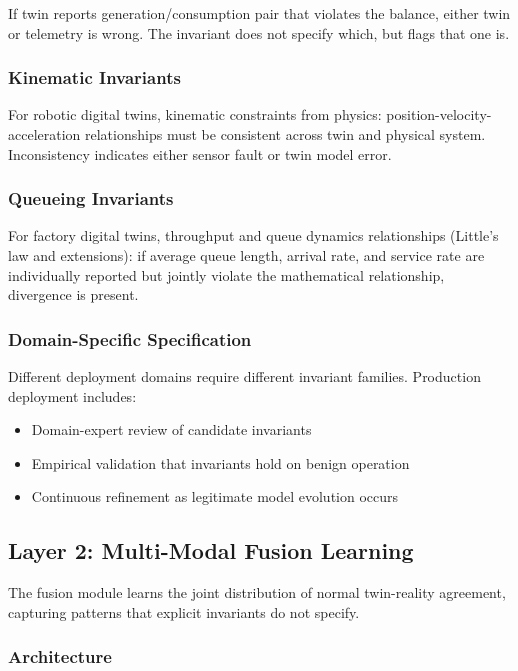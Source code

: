 \documentclass[sigconf,nonacm]{acmart}
\begin{document}
If twin reports generation/consumption pair that violates the
balance, either twin or telemetry is wrong. The invariant does
not specify which, but flags that one is.

\subsubsection{Kinematic Invariants}

For robotic digital twins, kinematic constraints from physics:
position-velocity-acceleration relationships must be consistent
across twin and physical system. Inconsistency indicates either
sensor fault or twin model error.

\subsubsection{Queueing Invariants}

For factory digital twins, throughput and queue dynamics
relationships (Little's law and extensions): if average queue
length, arrival rate, and service rate are individually reported
but jointly violate the mathematical relationship, divergence is
present.

\subsubsection{Domain-Specific Specification}

Different deployment domains require different invariant
families. Production deployment includes:

\begin{itemize}
  \item Domain-expert review of candidate invariants
  \item Empirical validation that invariants hold on benign
        operation
  \item Continuous refinement as legitimate model evolution
        occurs
\end{itemize}

\subsection{Layer 2: Multi-Modal Fusion Learning}

The fusion module learns the joint distribution of normal twin-reality
agreement, capturing patterns that explicit invariants do not
specify.

\subsubsection{Architecture}
\end{document}
